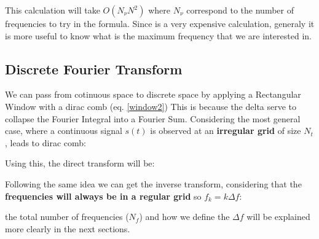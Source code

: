 
\newp This calculation will take $O(N_{\nu}N^2)$ where $N_{\nu}$ correspond to the number of frequencies to try in the formula. Since is a very expensive calculation, generaly it is more useful to know what is the maximum frequency that we are interested in.

\subsection{Discrete Fourier Transform}{\label{subsec_dft}}
\newp We can pass from cotinuous space to discrete space by applying a Rectangular Window with a dirac comb (eq. \ref{window2}) This is because the delta serve to collapse the Fourier Integral into a Fourier Sum. Considering the most general case, where a continuous signal $s(t)$ is observed at an \textbf{irregular grid} of size $N_t$, leads to dirac comb:


\newp Using this, the direct transform will be:


\newp Following the same idea we can get the inverse transform, considering that the \textbf{frequencies will always be in a regular grid} so $f_k = k \Delta f$:


\newp the total number of frequencies ($N_f$) and how we define the $\Delta f$ will be explained more clearly in the next sections.

